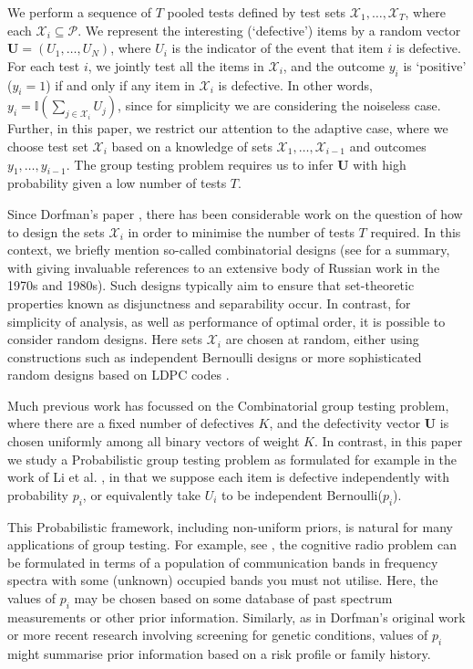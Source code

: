 \documentclass[conference]{IEEEtran}
\newcommand{\vc}[1]{{\mathbf{ #1}}}
\newcommand{\II}{{\mathbb{I}}}
\newcommand{\setP}{{\mathcal{P}}}
\newcommand{\setX}{{\mathcal{X}}}
\begin{document}
We perform a sequence of $T$ pooled tests defined by test sets $\setX_1, \ldots, \setX_T$, where each $\setX_i \subseteq \setP$. 
We represent the interesting (`defective') items by 
a random vector $\vc{U} = ( U_1, \ldots, U_N)$, where $U_i$ is the indicator of the event that item $i$ is defective. 
For each test $i$, we jointly 
test all the items in $\setX_i$, and the outcome $y_i$ is `positive' ($y_i = 1$) if and only if any item in $\setX_i$ is defective. In other words, 
$y_i = \II \left( \sum_{j \in \setX_i} U_j \right)$, since for simplicity we are  considering the noiseless case. Further, in this paper, we restrict our attention to
 the adaptive case, where we choose test set
$\setX_i$ based on a knowledge of sets $\setX_1, \ldots, \setX_{i-1}$ and outcomes $y_1, \ldots, y_{i-1}$. The group testing problem requires us to infer $\vc{U}$ with high
probability given a low number of tests $T$.

Since Dorfman's paper \cite{dorfman}, there has been considerable work on the question of how to design the sets $\setX_i$ in order to minimise the number of tests $T$
required. In this context, we briefly mention so-called combinatorial designs (see \cite{du, malyutov} for a summary, with \cite{malyutov} giving invaluable
references to an extensive body of Russian work in the 1970s and 1980s). Such designs typically aim to ensure that 
set-theoretic properties known as disjunctness
and separability occur. In contrast, for simplicity of analysis, as well as  performance of optimal order, it is possible to consider random designs. Here sets $\setX_i$ are chosen
at random, either using constructions such as independent Bernoulli designs \cite{atia, johnsonc8, johnson33} or more sophisticated  random designs based on LDPC codes \cite{wadayama}. 

Much previous work has focussed on the Combinatorial group testing problem, where there are a fixed number of defectives $K$, and the defectivity vector $\vc{U}$ is chosen uniformly among all
binary vectors of weight $K$. In contrast, in this paper we study a Probabilistic group testing problem as formulated
for example in the work of Li et al. \cite{li5}, in that we suppose 
 each item is defective  independently with probability \(p_i\), or equivalently take $U_i$ to be independent Bernoulli($p_i$).

This Probabilistic framework, including non-uniform priors, is natural for many applications of group testing.
For example, see \cite{atia2}, the cognitive radio problem can be formulated in terms of  a population
 of communication bands in frequency spectra with some (unknown) occupied bands you must not utilise. Here, the values of $p_i$ may be chosen
 based on some database of past spectrum measurements or other prior information. Similarly, as in Dorfman's original work  \cite{dorfman} or more recent 
research \cite{shental} involving screening for genetic conditions, values of
$p_i$ might summarise prior information based on a risk profile or  family history.
%
\end{document}
